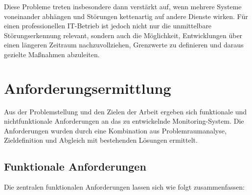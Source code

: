 Diese Probleme treten insbesondere dann verstärkt auf, wenn mehrere Systeme voneinander abhängen und Störungen kettenartig auf andere Dienste wirken. Für einen professionellen IT-Betrieb ist jedoch nicht nur die unmittelbare Störungserkennung relevant, sondern auch die Möglichkeit, Entwicklungen über einen längeren Zeitraum nachzuvollziehen, Grenzwerte zu definieren und daraus gezielte Maßnahmen abzuleiten.

\section{Anforderungsermittlung}
\label{sec:anforderungsermittlung}

Aus der Problemstellung und den Zielen der Arbeit ergeben sich funktionale und nichtfunktionale Anforderungen an das zu entwickelnde Monitoring-System. Die Anforderungen wurden durch eine Kombination aus Problemraumanalyse, Zieldefinition und Abgleich mit bestehenden Lösungen ermittelt.

\subsection{Funktionale Anforderungen}
\label{subsec:funktionale-anforderungen}

Die zentralen funktionalen Anforderungen lassen sich wie folgt zusammenfassen:

